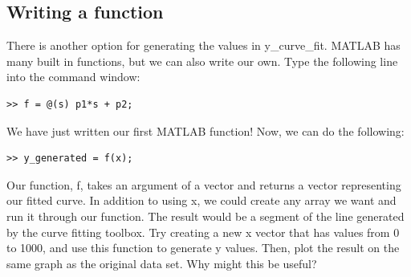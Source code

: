 \documentclass[paper=a4, fontsize=11pt]{scrartcl} %
\numberwithin{equation}{section} %
\numberwithin{figure}{section} %
\numberwithin{table}{section} %
\begin{document}
\subsection{Writing a function}
There is another option for generating the values in y\_curve\_fit. 
MATLAB has many built in functions, but we can also write our own.
Type the following line into the command window:
\begin{verbatim}
>> f = @(s) p1*s + p2;
\end{verbatim}
We have just written our first MATLAB function!
Now, we can do the following: 
\begin{verbatim}
>> y_generated = f(x);
\end{verbatim}
Our function, f, takes an argument of a vector and returns a vector representing our fitted curve.
In addition to using x, we could create any array we want and run it through our function.
The result would be a segment of the line generated by the curve fitting toolbox. 
Try creating a new x vector that has values from 0 to 1000, and use this function to generate y values. 
Then, plot the result on the same graph as the original data set. 
Why might this be useful?
\end{document}
